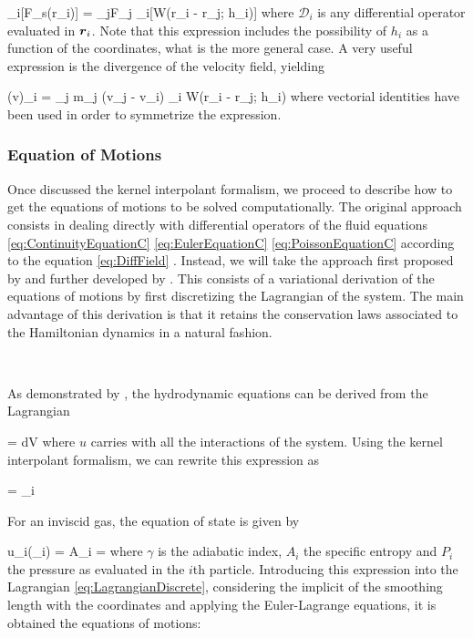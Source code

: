 \documentclass[a4,useAMS,usenatbib,usegraphicx,12pt]{article}
\begin{document}
{ _i[F_s(\bds r_i)] = \sum_jF_j 
_i[W(\bds r_i - \bds r_j; h_i)] }
where $\mathcal{D}_i$ is any differential operator evaluated in $\boldsymbol{ r }_i$. Note
that this expression includes the possibility of $h_i$ as a function of the 
coordinates, what is the more general case. A very useful expression is the 
divergence of the velocity field, yielding

{ (\nabla \cdot \bds v)_i = \sum_j m_j (\bds v_j - \bds v_i)
\cdot \nabla_i W(\bds r_i - \bds r_j; h_i) }
where vectorial identities have been used in order to symmetrize the expression.

\subsubsection*{Equation of Motions}

Once discussed the kernel interpolant formalism, we proceed to describe how to
get the equations of motions to be solved computationally. The original approach
consists in dealing directly with differential operators of the fluid equations 
\ref{eq:ContinuityEquationC} \ref{eq:EulerEquationC} \ref{eq:PoissonEquationC}
according to the equation \ref{eq:DiffField} \citep{Lucy77,Gingold77}. Instead,
we will take the approach first proposed by \citet{Gingold82} and further 
developed by \citet{Springel11}. This consists of a variational derivation of
the equations of motions by first discretizing the Lagrangian of the system. 
The main advantage of this derivation is that it retains the conservation laws
associated to the Hamiltonian dynamics in a natural fashion.

\

As demonstrated by \citet{Eckart60}, the hydrodynamic equations can be derived
from the Lagrangian

{  = \int \rho {}dV }
where $u$ carries with all the interactions of the system. Using the kernel 
interpolant formalism, we can rewrite this expression as

{  = \sum_i  }

For an inviscid gas, the equation of state is given by

{ u_i(\rho_i) = A_i = 
 }
where $\gamma$ is the adiabatic index, $A_i$ the specific entropy and $P_i$ the
pressure as evaluated in the $i$th particle. Introducing this expression into
the Lagrangian \ref{eq:LagrangianDiscrete}, considering the implicit of the
smoothing length with the coordinates and applying the Euler-Lagrange equations,
it is obtained the equations of motions:
\end{document}
